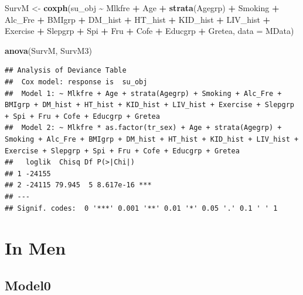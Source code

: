 \documentclass[
]{article}
\newenvironment{Shaded}{\begin{snugshade}}{\end{snugshade}}
\newcommand{\DataTypeTok}[1]{\textcolor[rgb]{0.13,0.29,0.53}{#1}}
\newcommand{\KeywordTok}[1]{\textcolor[rgb]{0.13,0.29,0.53}{\textbf{#1}}}
\newcommand{\NormalTok}[1]{#1}
\newcommand{\OperatorTok}[1]{\textcolor[rgb]{0.81,0.36,0.00}{\textbf{#1}}}
\newcommand{\StringTok}[1]{\textcolor[rgb]{0.31,0.60,0.02}{#1}}
\begin{document}
\begin{Shaded}
\begin{Highlighting}[]
\NormalTok{SurvM \textless{}{-}}\StringTok{  }\KeywordTok{coxph}\NormalTok{(su\_obj }\OperatorTok{\textasciitilde{}}\StringTok{ }\NormalTok{Mlkfre }\OperatorTok{+}\StringTok{ }\NormalTok{Age }\OperatorTok{+}\StringTok{ }\KeywordTok{strata}\NormalTok{(Agegrp) }\OperatorTok{+}\StringTok{ }\NormalTok{Smoking }\OperatorTok{+}\StringTok{ }\NormalTok{Alc\_Fre }\OperatorTok{+}\StringTok{ }
\StringTok{                   }\NormalTok{BMIgrp }\OperatorTok{+}\StringTok{ }\NormalTok{DM\_hist }\OperatorTok{+}\StringTok{ }\NormalTok{HT\_hist }\OperatorTok{+}\StringTok{ }\NormalTok{KID\_hist }\OperatorTok{+}\StringTok{ }\NormalTok{LIV\_hist }\OperatorTok{+}\StringTok{ }\NormalTok{Exercise }\OperatorTok{+}\StringTok{ }
\StringTok{                   }\NormalTok{Slepgrp }\OperatorTok{+}\StringTok{ }\NormalTok{Spi }\OperatorTok{+}\StringTok{ }\NormalTok{Fru }\OperatorTok{+}\StringTok{ }\NormalTok{Cofe }\OperatorTok{+}\StringTok{ }\NormalTok{Educgrp }\OperatorTok{+}\StringTok{ }\NormalTok{Gretea, }
                 \DataTypeTok{data =}\NormalTok{ MData)}


\KeywordTok{anova}\NormalTok{(SurvM, SurvM3)}
\end{Highlighting}
\end{Shaded}

\begin{verbatim}
## Analysis of Deviance Table
##  Cox model: response is  su_obj
##  Model 1: ~ Mlkfre + Age + strata(Agegrp) + Smoking + Alc_Fre + BMIgrp + DM_hist + HT_hist + KID_hist + LIV_hist + Exercise + Slepgrp + Spi + Fru + Cofe + Educgrp + Gretea
##  Model 2: ~ Mlkfre * as.factor(tr_sex) + Age + strata(Agegrp) + Smoking + Alc_Fre + BMIgrp + DM_hist + HT_hist + KID_hist + LIV_hist + Exercise + Slepgrp + Spi + Fru + Cofe + Educgrp + Gretea
##   loglik  Chisq Df P(>|Chi|)    
## 1 -24155                        
## 2 -24115 79.945  5 8.617e-16 ***
## ---
## Signif. codes:  0 '***' 0.001 '**' 0.01 '*' 0.05 '.' 0.1 ' ' 1
\end{verbatim}

\hypertarget{in-men}{%
\section{In Men}\label{in-men}}

\hypertarget{model0-1}{%
\subsection{Model0}\label{model0-1}}
\end{document}
